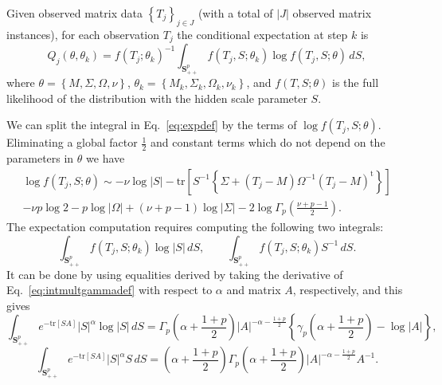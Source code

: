 \documentclass[english,listof=totoc]{scrartcl}
\begin{document}
Given observed matrix data $\left\{T_j\right\}_{j\in J}$ (with a total
of $|J|$ observed matrix instances), for each observation $T_j$ the
conditional expectation at step $k$ is
%
\begin{equation}
Q_j(\theta,\theta_k)=f(T_j;\theta_k)^{-1}\int_{\mathbf{S}_{++}^p}%
f(T_{j},S;\theta_k)\log f\left(T_{j},S;\theta\right)\,dS%
,\label{eq:expdef}
\end{equation}
where $\theta=\left\{M,\Sigma,\Omega,\nu\right\}$,
$\theta_k=\left\{M_k,\Sigma_k,\Omega_k,\nu_k\right\}$, and
$f(T,S;\theta)$ is the full likelihood of the distribution with the
hidden scale parameter $S$.

We can split the integral in Eq.~\eqref{eq:expdef} by the terms of $\log f(T_{j},S;\theta)$. Eliminating a global factor $\frac{1}{2}$ and constant terms which do not depend on the parameters in $\theta$ we have
\begin{equation}
\begin{split}\log f(T_{j},S;\theta)\sim -\nu\log|S|-\textrm{tr}\left[S^{-1}\left\{\Sigma+(T_j-M)\Omega^{-1}(T_j-M)^{\textrm{t}}\right\}\right]\\
-\nu p\log2-p\log |\Omega|+(\nu+p-1)\log |\Sigma|-2\log\Gamma_{p}\left(\frac{\nu+p-1}{2}\right).
\end{split}\label{eq:logf}
\end{equation}
The expectation computation requires computing the following two integrals:
\begin{equation}
\int_{\mathbf{S}_{++}^p}f(T_j,S;\theta_k)\log |S|\,dS, \qquad 
\int_{\mathbf{S}_{++}^p}f(T_j,S;\theta_k) S^{-1}\,dS.
\end{equation}
It can be done by using equalities derived by taking the derivative of Eq.~\eqref{eq:intmultgammadef} with respect to $\alpha$ and matrix $A$, respectively, and this gives
\begin{equation}
\int_{\mathbf{S}_{++}^p}e^{-\textrm{tr}\left[SA\right]}|S|^{\alpha}\log |S|\,dS=\Gamma_{p}\left(\alpha+\frac{1+p}{2}\right)|A|^{-\alpha-\frac{1+p}{2}}\left\{\gamma_{p}\left(\alpha+\frac{1+p}{2}\right)-\log |A|\right\},\label{eq:intderivative1}
\end{equation}
\begin{equation}
\int_{\mathbf{S}_{++}^p}e^{-\textrm{tr}\left[SA\right]}|S|^{\alpha}S\,dS=\left(\alpha+\frac{1+p}{2}\right)\Gamma_{p}\left(\alpha+\frac{1+p}{2}\right)|A|^{-\alpha-\frac{1+p}{2}}A^{-1}.\label{eq:intderivative2}
\end{equation}
\end{document}
